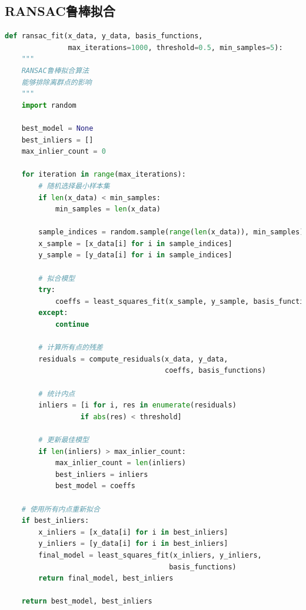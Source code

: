 \documentclass[a4paper,12pt]{article}
\theoremstyle{definition}
\begin{document}
\subsection{RANSAC鲁棒拟合}

\begin{lstlisting}[language=Python,caption={RANSAC算法实现}]
def ransac_fit(x_data, y_data, basis_functions, 
               max_iterations=1000, threshold=0.5, min_samples=5):
    """
    RANSAC鲁棒拟合算法
    能够排除离群点的影响
    """
    import random
    
    best_model = None
    best_inliers = []
    max_inlier_count = 0
    
    for iteration in range(max_iterations):
        # 随机选择最小样本集
        if len(x_data) < min_samples:
            min_samples = len(x_data)
        
        sample_indices = random.sample(range(len(x_data)), min_samples)
        x_sample = [x_data[i] for i in sample_indices]
        y_sample = [y_data[i] for i in sample_indices]
        
        # 拟合模型
        try:
            coeffs = least_squares_fit(x_sample, y_sample, basis_functions)
        except:
            continue
        
        # 计算所有点的残差
        residuals = compute_residuals(x_data, y_data, 
                                      coeffs, basis_functions)
        
        # 统计内点
        inliers = [i for i, res in enumerate(residuals) 
                  if abs(res) < threshold]
        
        # 更新最佳模型
        if len(inliers) > max_inlier_count:
            max_inlier_count = len(inliers)
            best_inliers = inliers
            best_model = coeffs
    
    # 使用所有内点重新拟合
    if best_inliers:
        x_inliers = [x_data[i] for i in best_inliers]
        y_inliers = [y_data[i] for i in best_inliers]
        final_model = least_squares_fit(x_inliers, y_inliers, 
                                       basis_functions)
        return final_model, best_inliers
    
    return best_model, best_inliers
\end{lstlisting}
\end{document}
